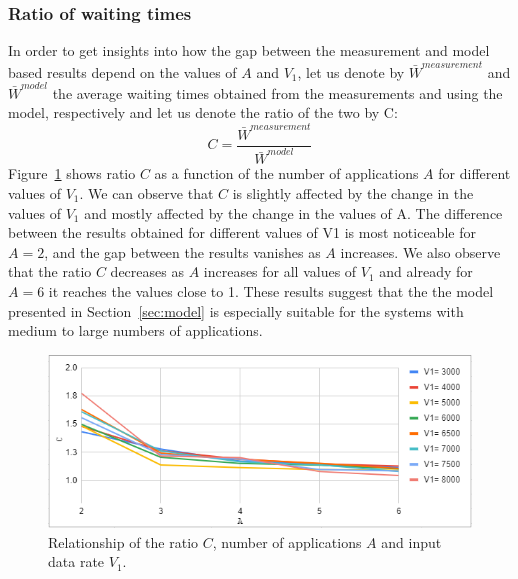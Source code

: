 \documentclass[english]{kththesis}
\begin{document}
\subsubsection{Ratio of waiting times}
In order to get insights into how the gap between the measurement and model based results depend on the values of \(A\) and \(V_1\), let us denote by \(\bar{W}^{measurement}\) and \(\bar{W}^{model}\) the average waiting times obtained from the measurements and using the model, respectively and let us denote the ratio of the two by C:
\begin{equation}
C = \frac{\bar{W}^{measurement}}{\bar{W}^{model}}
\end{equation}
Figure~\ref{fig:missingC} shows ratio \(C\) as a function of the number of applications \(A\) for different values of \(V_1\). We can observe that \(C\) is slightly affected by the change in the values of \(V_1\) and mostly affected by the change in the values of A. The difference between the results obtained for different values of V1 is most noticeable for \(A=2\), and the gap between the results vanishes as \(A\) increases. We also observe that the ratio \(C\) decreases as \(A\) increases for all values of \(V_1\) and already for \(A = 6\) it reaches the values close to 1. These results suggest that the the model presented in Section~\ref{sec:model} is especially suitable for the systems with medium to large numbers of applications.
\begin{figure}[!ht]
  \centering
    \includegraphics[width=1\textwidth]{Fig19.png}
  \caption{Relationship of the ratio \(C\), number of applications \(A\) and input data rate \(V_1\).}
  \label{fig:missingC}
\end{figure}
\end{document}

